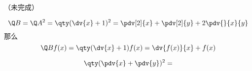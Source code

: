 
（未完成）


\begin{equation}
\Q B = \Q A^2 = \qty(\dv{x} + 1)^2 = \pdv[2]{x} + \pdv[2]{y} + 2\pdv{}{x}{y}
\end{equation}
那么
\begin{equation}
\Q B f(x) = \qty(\dv{x} + 1)f(x) = \dv{f(x)}{x} + f(x)
\end{equation}


\begin{equation}
\qty(\pdv{x} + \pdv{y})^2 = 
\end{equation}

